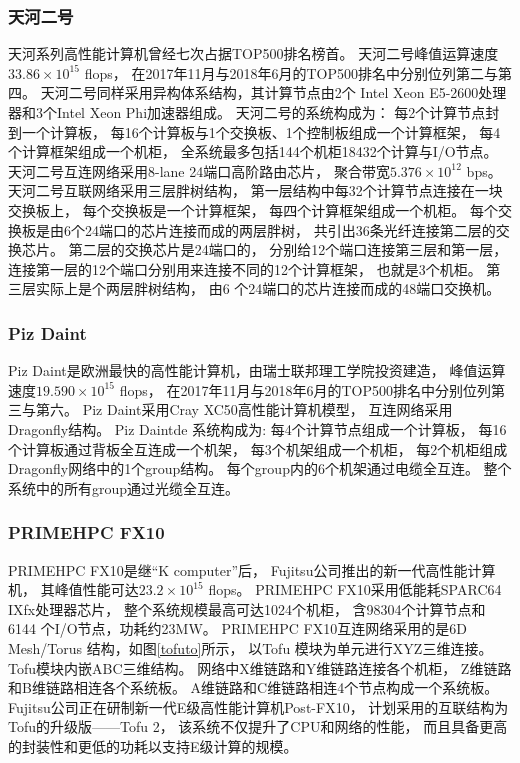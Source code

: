 \subsubsection{天河二号}
天河系列高性能计算机曾经七次占据TOP500排名榜首。
天河二号峰值运算速度$33.86\times10^{15}$ flops，
在2017年11月与2018年6月的TOP500排名中分别位列第二与第四。
天河二号同样采用异构体系结构，其计算节点由2个
Intel Xeon E5-2600处理器和3个Intel Xeon Phi加速器组成。
天河二号的系统构成为：
每2个计算节点封到一个计算板，
每16个计算板与1个交换板、1个控制板组成一个计算框架，
每4个计算框架组成一个机柜，
全系统最多包括144个机柜18432个计算与I/O节点。
天河二号互连网络采用8-lane 24端口高阶路由芯片，
聚合带宽$5.376\times10^{12}$ bps。
天河二号互联网络采用三层胖树结构，
第一层结构中每32个计算节点连接在一块交换板上，
每个交换板是一个计算框架，
每四个计算框架组成一个机柜。
每个交换板是由6个24端口的芯片连接而成的两层胖树，
共引出36条光纤连接第二层的交换芯片。
第二层的交换芯片是24端口的，
分别给12个端口连接第三层和第一层，
连接第一层的12个端口分别用来连接不同的12个计算框架，
也就是3个机柜。
第三层实际上是个两层胖树结构，
由6 个24端口的芯片连接而成的48端口交换机。

\subsubsection{Piz Daint}
Piz Daint是欧洲最快的高性能计算机，由瑞士联邦理工学院投资建造，
峰值运算速度$19.590\times10^{15}$ flops，
在2017年11月与2018年6月的TOP500排名中分别位列第三与第六。
Piz Daint采用Cray XC50高性能计算机模型，
互连网络采用Dragonfly结构。
Piz Daintde 系统构成为:
每4个计算节点组成一个计算板，
每16个计算板通过背板全互连成一个机架，
每3个机架组成一个机柜，
每2个机柜组成Dragonfly网络中的1个group结构。
每个group内的6个机架通过电缆全互连。
整个系统中的所有group通过光缆全互连。

\subsubsection{PRIMEHPC FX10}
PRIMEHPC FX10是继“K computer”后，
Fujitsu公司推出的新一代高性能计算机，
其峰值性能可达$23.2\times10^{15}$ flops。
PRIMEHPC FX10采用低能耗SPARC64 IXfx处理器芯片，
整个系统规模最高可达1024个机柜，
含98304个计算节点和6144 个I/O节点，功耗约23MW。
PRIMEHPC FX10互连网络采用的是6D Mesh/Torus 结构，如图\ref{tofuto}所示，
以Tofu 模块为单元进行XYZ三维连接。
Tofu模块内嵌ABC三维结构。
网络中X维链路和Y维链路连接各个机柜，
Z维链路和B维链路相连各个系统板。
A维链路和C维链路相连4个节点构成一个系统板。
Fujitsu公司正在研制新一代E级高性能计算机Post-FX10，
计划采用的互联结构为Tofu的升级版——Tofu 2，
该系统不仅提升了CPU和网络的性能，
而且具备更高的封装性和更低的功耗以支持E级计算的规模。

